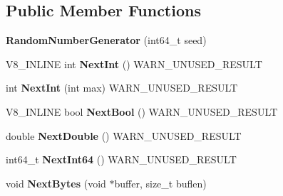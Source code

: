 \subsection*{Public Member Functions}
\begin{DoxyCompactItemize}
\item 
{\bfseries Random\+Number\+Generator} (int64\+\_\+t seed)\hypertarget{classv8_1_1base_1_1_random_number_generator_adb6de9543dad50afa7986a2e35ce003f}{}\label{classv8_1_1base_1_1_random_number_generator_adb6de9543dad50afa7986a2e35ce003f}

\item 
V8\+\_\+\+I\+N\+L\+I\+NE int {\bfseries Next\+Int} () W\+A\+R\+N\+\_\+\+U\+N\+U\+S\+E\+D\+\_\+\+R\+E\+S\+U\+LT\hypertarget{classv8_1_1base_1_1_random_number_generator_a3a0bf0e6b408487b19345ae7ec6e17c2}{}\label{classv8_1_1base_1_1_random_number_generator_a3a0bf0e6b408487b19345ae7ec6e17c2}

\item 
int {\bfseries Next\+Int} (int max) W\+A\+R\+N\+\_\+\+U\+N\+U\+S\+E\+D\+\_\+\+R\+E\+S\+U\+LT\hypertarget{classv8_1_1base_1_1_random_number_generator_a5138337731a1488f9d4276d42b2cca04}{}\label{classv8_1_1base_1_1_random_number_generator_a5138337731a1488f9d4276d42b2cca04}

\item 
V8\+\_\+\+I\+N\+L\+I\+NE bool {\bfseries Next\+Bool} () W\+A\+R\+N\+\_\+\+U\+N\+U\+S\+E\+D\+\_\+\+R\+E\+S\+U\+LT\hypertarget{classv8_1_1base_1_1_random_number_generator_a827ce8339b1815695ec9a34814955a93}{}\label{classv8_1_1base_1_1_random_number_generator_a827ce8339b1815695ec9a34814955a93}

\item 
double {\bfseries Next\+Double} () W\+A\+R\+N\+\_\+\+U\+N\+U\+S\+E\+D\+\_\+\+R\+E\+S\+U\+LT\hypertarget{classv8_1_1base_1_1_random_number_generator_abf48d65e544dbef73ee725792e0324f5}{}\label{classv8_1_1base_1_1_random_number_generator_abf48d65e544dbef73ee725792e0324f5}

\item 
int64\+\_\+t {\bfseries Next\+Int64} () W\+A\+R\+N\+\_\+\+U\+N\+U\+S\+E\+D\+\_\+\+R\+E\+S\+U\+LT\hypertarget{classv8_1_1base_1_1_random_number_generator_abc5738e0ce603a382574f0f9c543f486}{}\label{classv8_1_1base_1_1_random_number_generator_abc5738e0ce603a382574f0f9c543f486}

\item 
void {\bfseries Next\+Bytes} (void $\ast$buffer, size\+\_\+t buflen)\hypertarget{classv8_1_1base_1_1_random_number_generator_a0094583611a7499452662dcdcc2b6ddb}{}\label{classv8_1_1base_1_1_random_number_generator_a0094583611a7499452662dcdcc2b6ddb}


\end{DoxyCompactItemize}
